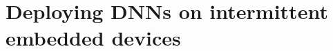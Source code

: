 \chapter{Deploying DNNs on intermittent embedded devices}
\label{chapter:sonic}

\newcommand{\metric}{IMpJ\xspace}
\newcommand{\genesis}{{\sc Genesis}\xspace}
\newcommand{\tails}{{\protect\fauxsc{Tails}}\xspace}
\newcommand{\sonictails}{{\sonic}\,{\small\&}\,\tails}











